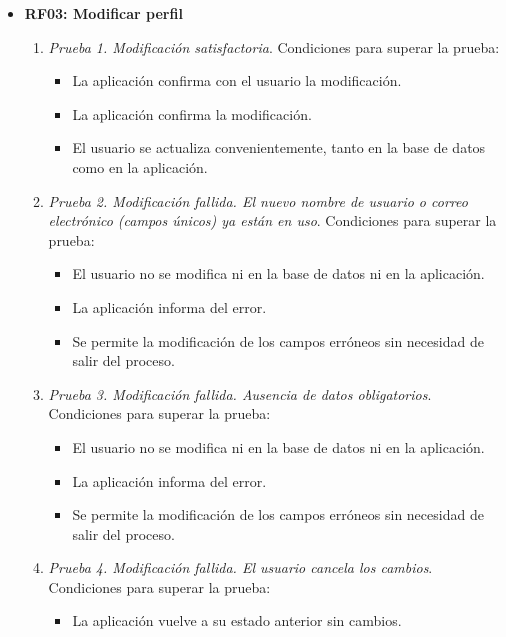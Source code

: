 \begin{itemize}
	\item \textbf{RF03: Modificar perfil}
	\begin{enumerate}
		\item \textit{Prueba 1. Modificación satisfactoria}. Condiciones para superar la prueba:
		\begin{itemize}
			\item La aplicación confirma con el usuario la modificación.
			\item La aplicación confirma la modificación.
			\item El usuario se actualiza convenientemente, tanto en la base de datos como en la aplicación.
		\end{itemize}
		\item \textit{Prueba 2. Modificación fallida. El nuevo nombre de usuario o correo electrónico (campos únicos) ya están en uso}. Condiciones para superar la prueba:
		\begin{itemize}
			\item El usuario no se modifica ni en la base de datos ni en la aplicación.
			\item La aplicación informa del error.
			\item Se permite la modificación de los campos erróneos sin necesidad de salir del proceso.
		\end{itemize}
		\item \textit{Prueba 3. Modificación fallida. Ausencia de datos obligatorios}. Condiciones para superar la prueba:
		\begin{itemize}
			\item El usuario no se modifica ni en la base de datos ni en la aplicación.
			\item La aplicación informa del error.
			\item Se permite la modificación de los campos erróneos sin necesidad de salir del proceso.
		\end{itemize}
		\item \textit{Prueba 4. Modificación fallida. El usuario cancela los cambios}. Condiciones para superar la prueba:
		\begin{itemize}
			\item La aplicación vuelve a su estado anterior sin cambios.
		\end{itemize}
	\end{enumerate}
	

\end{itemize}
